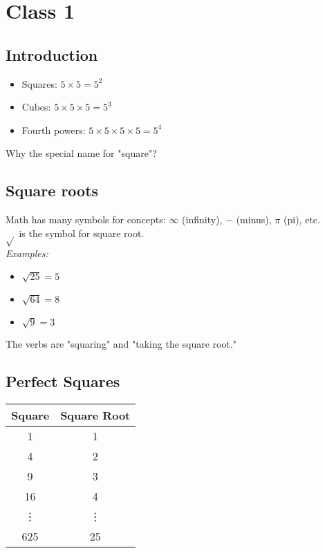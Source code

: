 \documentclass{hw}
\begin{document}
\section*{\normalsize Class 1}

\subsection*{\normalsize Introduction}
\begin{itemize}
    \item Squares: $5 \times 5 = 5^2$
    \item Cubes: $5 \times 5 \times 5 = 5^3$
    \item Fourth powers: $5 \times 5 \times 5 \times 5 = 5^4$
\end{itemize}
Why the special name for "square"?

\subsection*{Square roots}
Math has many symbols for concepts: $\infty$ (infinity), $-$ (minus), $\pi$ (pi), etc.
\\ \smallskip
$\sqrt{}$ is the symbol for square root.
\\ \smallskip
\emph{Examples:}
\begin{itemize}
    \item $\sqrt{25} = 5$
    \item $\sqrt{64} = 8$
    \item $\sqrt{9} = 3$
\end{itemize}
The verbs are "squaring" and "taking the square root."
\\ \smallskip

\subsection*{\normalsize Perfect Squares}
\begin{center}
\begin{tabular}{|c|c|}
    \hline
    Square & Square Root \\
    \hline
    1 & 1 \\
    \hline
    4 & 2 \\
    \hline
    9 & 3 \\
    \hline
    16 & 4 \\
    \hline
    \vdots & \vdots \\
    \hline
    625 & 25 \\
    \hline
\end{tabular}
\end{center}
\end{document}
